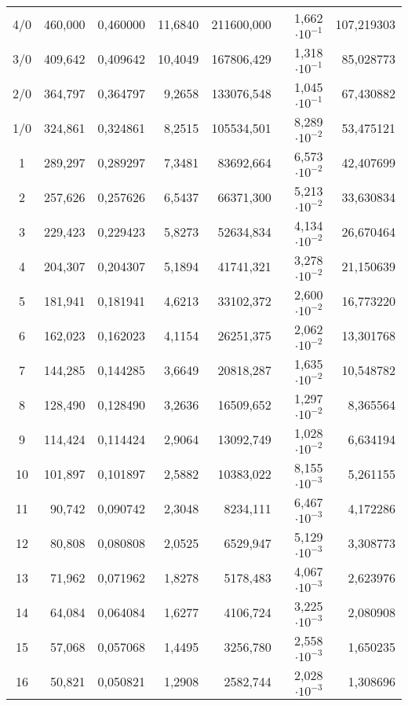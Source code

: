 \begin{longtable}{crrrrrr}
 4/0  &    460,000 &   0,460000 &    11,6840 & 211600,000 &  1,662$\cdot 10^{-1}$ & 107,219303 \\
 3/0  &    409,642 &   0,409642 &    10,4049 & 167806,429 &  1,318$\cdot 10^{-1}$ &  85,028773 \\
 2/0  &    364,797 &   0,364797 &     9,2658 & 133076,548 &  1,045$\cdot 10^{-1}$ &  67,430882 \\
 1/0  &    324,861 &   0,324861 &     8,2515 & 105534,501 &  8,289$\cdot 10^{-2}$ &  53,475121 \\
 1 &    289,297 &   0,289297 &     7,3481 &  83692,664 &  6,573$\cdot 10^{-2}$ &  42,407699 \\
 2 &    257,626 &   0,257626 &     6,5437 &  66371,300 &  5,213$\cdot 10^{-2}$ &  33,630834 \\
 3 &    229,423 &   0,229423 &     5,8273 &  52634,834 &  4,134$\cdot 10^{-2}$ &  26,670464 \\
 4 &    204,307 &   0,204307 &     5,1894 &  41741,321 &  3,278$\cdot 10^{-2}$ &  21,150639 \\
 5 &    181,941 &   0,181941 &     4,6213 &  33102,372 &  2,600$\cdot 10^{-2}$ &  16,773220 \\
 6 &    162,023 &   0,162023 &     4,1154 &  26251,375 &  2,062$\cdot 10^{-2}$ &  13,301768 \\
 7 &    144,285 &   0,144285 &     3,6649 &  20818,287 &  1,635$\cdot 10^{-2}$ &  10,548782 \\
 8 &    128,490 &   0,128490 &     3,2636 &  16509,652 &  1,297$\cdot 10^{-2}$ &   8,365564 \\
 9 &    114,424 &   0,114424 &     2,9064 &  13092,749 &  1,028$\cdot 10^{-2}$ &   6,634194 \\
10 &    101,897 &   0,101897 &     2,5882 &  10383,022 &  8,155$\cdot 10^{-3}$ &   5,261155 \\
11 &     90,742 &   0,090742 &     2,3048 &   8234,111 &  6,467$\cdot 10^{-3}$ &   4,172286 \\
12 &     80,808 &   0,080808 &     2,0525 &   6529,947 &  5,129$\cdot 10^{-3}$ &   3,308773 \\
13 &     71,962 &   0,071962 &     1,8278 &   5178,483 &  4,067$\cdot 10^{-3}$ &   2,623976 \\
14 &     64,084 &   0,064084 &     1,6277 &   4106,724 &  3,225$\cdot 10^{-3}$ &   2,080908 \\
15 &     57,068 &   0,057068 &     1,4495 &   3256,780 &  2,558$\cdot 10^{-3}$ &   1,650235 \\
16 &     50,821 &   0,050821 &     1,2908 &   2582,744 &  2,028$\cdot 10^{-3}$ &   1,308696 \\

\end{longtable}

